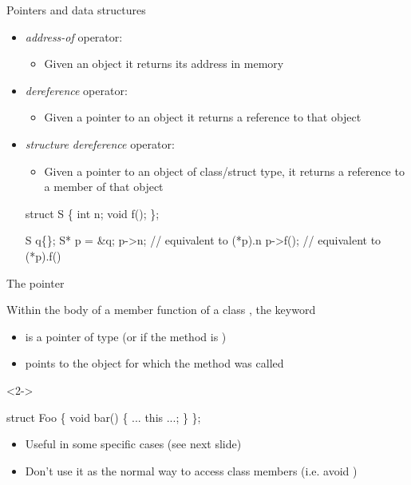 \begin{frame}[fragile]{Pointers and data structures}

  \begin{itemize}
  \item<1-> \textit{address-of} operator: \alert{\code{\&}}
    \begin{itemize}
    \item Given an object it returns its address in memory
    \end{itemize}
  \item<2-> \textit{dereference} operator: \alert{\code{*}}
    \begin{itemize}
    \item Given a pointer to an object it returns a reference to that object
    \end{itemize}
  \item<3-> \textit{structure dereference} operator: \alert{\code{->}}
    \begin{itemize}
    \item Given a pointer to an object of class/struct type, it returns a
      reference to a member of that object
    \end{itemize}
    \begin{codeblock}
struct S \{
  int n;
  void f();
\};

S q\{\ddd\};
S* p = &q;
p->n;        // equivalent to (*p).n
p->f();      // equivalent to (*p).f()\end{codeblock}

  \end{itemize}
\end{frame}

\begin{frame}[fragile]{The  pointer}

  Within the body of a member function of a class , the keyword
  \textbf{}
  \begin{itemize}
  \item is a pointer of type  (or  if the method is
    )
  \item points to the object for which the method was called
  \end{itemize}

\begin{codeblock}<2->{
struct Foo \{
  void bar() \{
    ... \alert{this} ...;
  \}
\};

}\end{codeblock}

  \begin{itemize}
  \item<6-> Useful in some specific cases (see next slide)
  \item<6-> Don't use it as the normal way to access class members (i.e. avoid
    )
  \end{itemize}

\end{frame}

